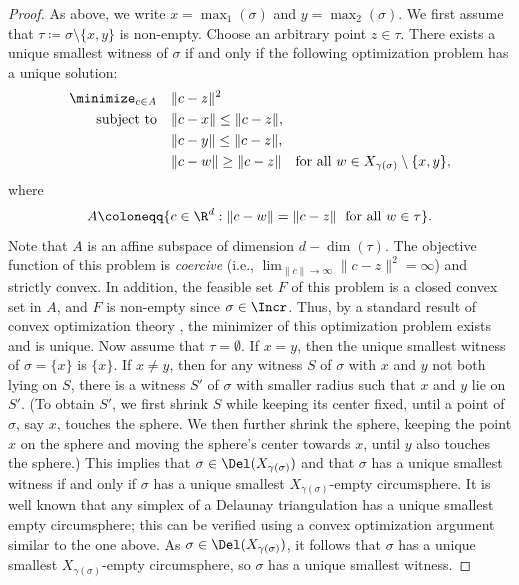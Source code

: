 \begin{proof}
As above, we write $x=\max_1(\sigma)$ and $y=\max_2(\sigma)$.  We first assume that $\tau \coloneqq \sigma \setminus \{x, y\}$ is non-empty.  Choose an arbitrary point $z\in \tau$.  There exists a unique smallest witness of $\sigma$ if and only if the following optimization problem has a unique solution:
\begin{equation}\label{eq:opt_Prob}
\begin{aligned}
\minimize_{c \in A} \quad & \|c - z\|^2 \\
\text{subject to} \quad & \|c - x\| \leq \|c - z\|, \\
& \|c - y\| \leq \|c - z\|, \\
& \|c - w\| \geq \|c - z\| \quad \text{for all } w \in X_{\gamma(\sigma)} \setminus \{x, y\},
\end{aligned}
\end{equation}
where \[A \coloneqq \{c\in \R^d : \|c-w\| = \|c-z\| \; \textup{ for all } w\in \tau\}.\]  Note that $A$ is an affine subspace 
of dimension $d-\dim(\tau)$.  The objective function of this problem is \emph{coercive} (i.e., $\lim_{\|c\|\to \infty}  \|c - z\|^2=\infty$) and strictly convex.  In addition, the feasible set ${F}$ of this problem is a closed convex set %
in $A$, and ${F}$ is non-empty since $\sigma \in \Incr$.  Thus, by a standard result of convex optimization theory \cite[Section 3.1]{bertsekas2009convex}, the minimizer of this optimization problem exists and is unique.
%
Now assume that  $\tau = \emptyset$.  If $x = y$, then the unique smallest witness of $\sigma=\{x\}$ is $\{x\}$.  If $x\ne y$, then for any witness $S$ of $\sigma$ with $x$ and $y$ not both lying on $S$, there is a witness $S'$ of $\sigma$ with smaller radius such that $x$ and $y$ lie on $S'$.  (To obtain $S'$, we first shrink $S$ while keeping its center fixed, until a point of $\sigma$, say $x$, touches the sphere.  We then further shrink the sphere, keeping the point $x$ on the sphere and moving the sphere's center towards $x$, until $y$ also touches the sphere.)  This implies that $\sigma\in \Del(X_{\gamma(\sigma)})$ and that  $\sigma$ has a unique smallest witness if and only if $\sigma$ has a unique smallest $X_{\gamma(\sigma)}$-empty circumsphere.  It is well known that any simplex of a Delaunay triangulation has a unique smallest empty circumsphere; this can be verified using a convex optimization argument similar to the one above.  As  $\sigma\in \Del(X_{\gamma(\sigma)})$, it follows that $\sigma$ has a unique smallest $X_{\gamma(\sigma)}$-empty circumsphere, so $\sigma$ has a unique smallest witness.
\end{proof}
